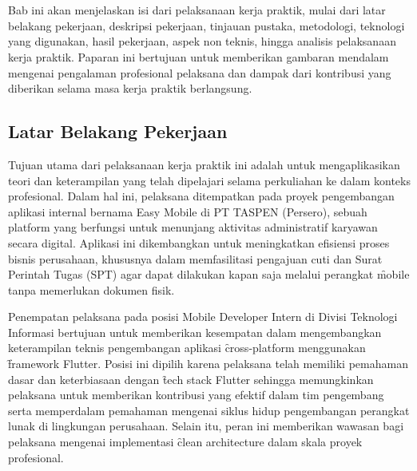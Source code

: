 \chapter{\babDua}
\label{bab:2}
Bab ini akan menjelaskan isi dari pelaksanaan kerja praktik, mulai dari latar
belakang pekerjaan, deskripsi pekerjaan, tinjauan pustaka, metodologi,
teknologi yang digunakan, hasil pekerjaan, aspek non teknis, hingga analisis
pelaksanaan kerja praktik. Paparan ini bertujuan untuk memberikan gambaran mendalam mengenai pengalaman profesional pelaksana dan dampak dari kontribusi yang diberikan selama masa kerja praktik berlangsung.



\section{Latar Belakang Pekerjaan}
\label{sec:latarBelakangPekerjaan}
Tujuan utama dari pelaksanaan kerja praktik ini adalah untuk mengaplikasikan teori dan keterampilan yang telah dipelajari selama perkuliahan ke dalam konteks profesional. Dalam hal ini, pelaksana ditempatkan pada proyek pengembangan aplikasi internal bernama Easy Mobile di PT TASPEN (Persero), sebuah platform yang berfungsi untuk menunjang aktivitas administratif karyawan secara digital. Aplikasi ini dikembangkan untuk meningkatkan efisiensi proses bisnis perusahaan, khususnya dalam memfasilitasi pengajuan cuti dan Surat Perintah Tugas (SPT) agar dapat dilakukan kapan saja melalui perangkat \f{mobile} tanpa memerlukan dokumen fisik.

Penempatan pelaksana pada posisi Mobile Developer Intern di Divisi Teknologi Informasi bertujuan untuk memberikan kesempatan dalam mengembangkan keterampilan teknis pengembangan aplikasi \f{cross-platform} menggunakan \f{framework} Flutter. Posisi ini dipilih karena pelaksana telah memiliki pemahaman dasar dan keterbiasaan dengan \f{tech stack} Flutter sehingga memungkinkan pelaksana untuk memberikan kontribusi yang efektif dalam tim pengembang serta memperdalam pemahaman mengenai siklus hidup pengembangan perangkat lunak di lingkungan perusahaan. Selain itu, peran ini memberikan wawasan bagi pelaksana mengenai implementasi \f{clean architecture} dalam skala proyek profesional.

